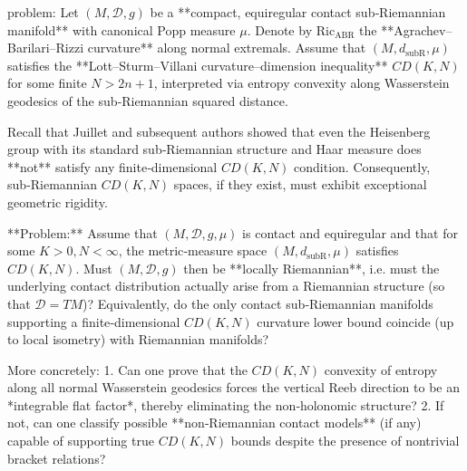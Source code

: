 problem:  
Let \((M,\mathcal D,g)\) be a **compact, equiregular contact sub‑Riemannian manifold** with canonical Popp measure \(\mu\).  Denote by \(\mathrm{Ric}_{\mathrm{ABR}}\) the **Agrachev–Barilari–Rizzi curvature** along normal extremals.  Assume that \((M,d_{\mathrm{subR}},\mu)\) satisfies the **Lott–Sturm–Villani curvature–dimension inequality** \(CD(K,N)\) for some finite \(N>2n+1\), interpreted via entropy convexity along Wasserstein geodesics of the sub‑Riemannian squared distance.  

Recall that Juillet and subsequent authors showed that even the Heisenberg group with its standard sub‑Riemannian structure and Haar measure does **not** satisfy any finite‑dimensional \(CD(K,N)\) condition.  Consequently, sub‑Riemannian \(CD(K,N)\) spaces, if they exist, must exhibit exceptional geometric rigidity.  

**Problem:**  
Assume that \((M,\mathcal D,g,\mu)\) is contact and equiregular and that for some \(K>0,N<\infty\), the metric‑measure space \((M,d_{\mathrm{subR}},\mu)\) satisfies \(CD(K,N)\).  
Must \((M,\mathcal D,g)\) then be **locally Riemannian**, i.e. must the underlying contact distribution actually arise from a Riemannian structure (so that \(\mathcal{D}=TM\))?  
Equivalently, do the only contact sub‑Riemannian manifolds supporting a finite‑dimensional \(CD(K,N)\) curvature lower bound coincide (up to local isometry) with Riemannian manifolds?  

More concretely:
1. Can one prove that the \(CD(K,N)\) convexity of entropy along all normal Wasserstein geodesics forces the vertical Reeb direction to be an *integrable flat factor*, thereby eliminating the non‑holonomic structure?  
2. If not, can one classify possible **non‑Riemannian contact models** (if any) capable of supporting true \(CD(K,N)\) bounds despite the presence of nontrivial bracket relations?  

